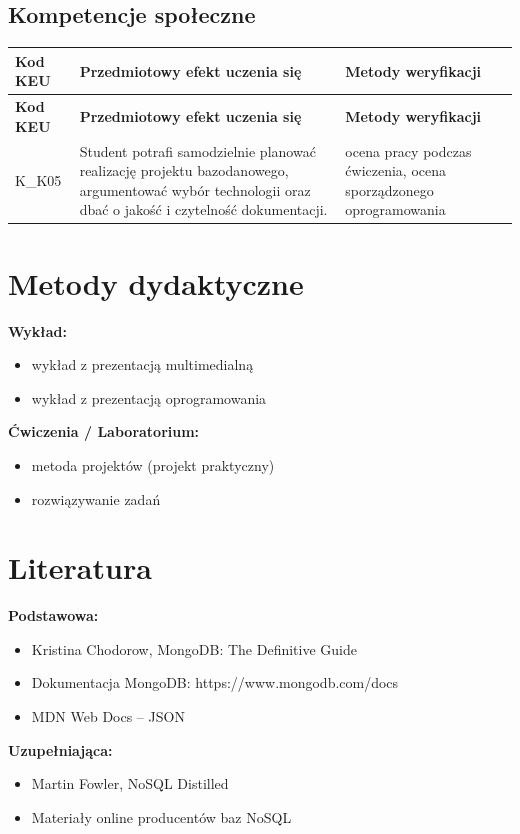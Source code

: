 \documentclass[12pt, a4paper]{article}
\newcommand{\thdrule}{\noalign{\global\setlength{\extrarowheight}{0pt}}}
\newcommand{\thdend}{\noalign{\global\setlength{\extrarowheight}{3pt}}}
\begin{document}
\subsection*{Kompetencje społeczne}
{\scriptsize
\begin{longtable}{m{1.6cm}m{9.0cm}m{4.2cm}}
\thdrule\toprule
\rowcolor{pjatkRed} {\color{white}\footnotesize\textbf{\vphantom{Ag}Kod KEU}} & {\color{white}\footnotesize\textbf{\vphantom{Ag}Przedmiotowy efekt uczenia się}} & {\color{white}\footnotesize\textbf{\vphantom{Ag}Metody weryfikacji}} \\
\midrule\thdend
\endfirsthead
\thdrule\toprule
\rowcolor{pjatkRed} {\color{white}\footnotesize\textbf{\vphantom{Ag}Kod KEU}} & {\color{white}\footnotesize\textbf{\vphantom{Ag}Przedmiotowy efekt uczenia się}} & {\color{white}\footnotesize\textbf{\vphantom{Ag}Metody weryfikacji}} \\
\midrule\thdend
\endhead
  \rowcolor{tableRowLight} K\_K05 & Student potrafi samodzielnie planować realizację projektu bazodanowego, argumentować wybór technologii oraz dbać o jakość i czytelność dokumentacji. & ocena pracy podczas ćwiczenia, ocena sporządzonego oprogramowania \\
\bottomrule
\end{longtable}}

\section{Metody dydaktyczne}

\textbf{Wykład:}
\begin{itemize}
  \item wykład z prezentacją multimedialną
  \item wykład z prezentacją oprogramowania
\end{itemize}
\vspace{4pt}
\textbf{Ćwiczenia / Laboratorium:}
\begin{itemize}
  \item metoda projektów (projekt praktyczny)
  \item rozwiązywanie zadań
\end{itemize}
\vspace{4pt}


\section{Literatura}

\textbf{Podstawowa:}
\begin{itemize}
  \item Kristina Chodorow, MongoDB: The Definitive Guide
  \item Dokumentacja MongoDB: https://www.mongodb.com/docs
  \item MDN Web Docs – JSON
\end{itemize}

\textbf{Uzupełniająca:}
\begin{itemize}
  \item Martin Fowler, NoSQL Distilled
  \item Materiały online producentów baz NoSQL
\end{itemize}
\end{document}

